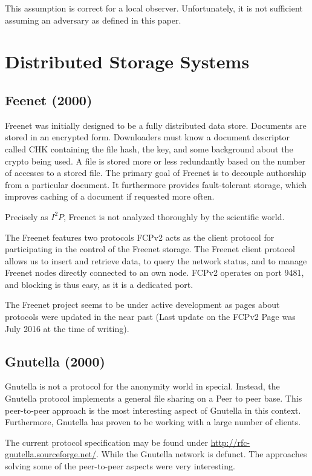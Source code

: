 This assumption is correct for a local observer. Unfortunately, it is not sufficient assuming an adversary as defined in this paper.

\section{Distributed Storage Systems}
\subsection{Feenet (2000)}
Freenet was initially designed to be a fully distributed data store\cite{freenet}. Documents are stored in an encrypted form. Downloaders must know a document descriptor called CHK containing the file hash, the key, and some background about the crypto being used. A file is stored more or less redundantly based on the number of accesses to a stored file. The primary goal of Freenet is to decouple authorship from a particular document. It furthermore provides fault-tolerant storage, which improves caching of a document if requested more often.

Precisely as $I^2P$, Freenet is not analyzed thoroughly by the scientific world. 

The Freenet features two protocols FCPv2 acts as the client protocol for participating in the control of the Freenet storage. The Freenet client protocol allows us to insert and retrieve data, to query the network status, and to manage Freenet nodes directly connected to an own node. FCPv2 operates on port 9481, and blocking is thus easy, as it is a dedicated port. 

The Freenet project seems to be under active development as pages about protocols were updated in the near past (Last update on the FCPv2 Page was July  2016 at the time of writing).

\subsection{Gnutella (2000)}
Gnutella is not a protocol for the anonymity world in special. Instead, the Gnutella protocol implements a general file sharing on a Peer to peer base. This peer-to-peer approach is the most interesting aspect of Gnutella in this context. Furthermore, Gnutella has proven to be working with a large number of clients.

The current protocol specification may be found under \href{http://rfc-gnutella.sourceforge.net/developer/stable/index.html}{http://rfc-gnutella.sourceforge.net/}. While the Gnutella network is defunct. The approaches solving some of the peer-to-peer aspects were very interesting.

